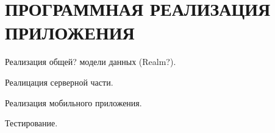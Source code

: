 \section[Программная реализация приложения]{%
  ПРОГРАММНАЯ РЕАЛИЗАЦИЯ ПРИЛОЖЕНИЯ
}

\label{sec:implementation}

Реализация общей? модели данных (Realm?).

Реалицация серверной части.

Реализация мобильного приложения.


Тестирование.